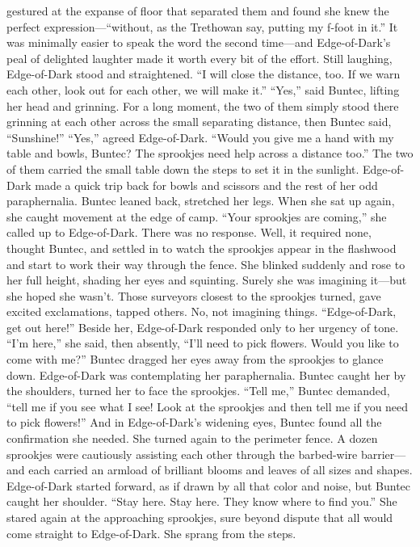 \documentclass[9pt]{article}
\begin{document}
gestured at the expanse of floor that separated them and found she knew the perfect
expression—“without, as the Trethowan say, putting my f-foot in it.” It was minimally easier to speak the
word the second time—and Edge-of-Dark’s peal of delighted laughter made it worth every bit of the
effort.
Still laughing, Edge-of-Dark stood and straightened. “I will close the distance, too. If we warn each
other, look out for each other, we will make it.”
“Yes,” said Buntec, lifting her head and grinning. For a long moment, the two of them simply stood
there grinning at each other across the small separating distance, then Buntec said, “Sunshine!”
“Yes,” agreed Edge-of-Dark. “Would you give me a hand with my table and bowls, Buntec? The
sprookjes need help across a distance too.”
The two of them carried the small table down the steps to set it in the sunlight. Edge-of-Dark made a
quick trip back for bowls and scissors and the rest of her odd paraphernalia.
Buntec leaned back, stretched her legs. When she sat up again, she caught movement at the edge of
camp. “Your sprookjes are coming,” she called up to Edge-of-Dark. There was no response. Well, it
required none, thought Buntec, and settled in to watch the sprookjes appear in the flashwood and start to
work their way through the fence.
She blinked suddenly and rose to her full height, shading her eyes and squinting. Surely she was
imagining it—but she hoped she wasn’t.
Those surveyors closest to the sprookjes turned, gave excited exclamations, tapped others. No, not
imagining things. “Edge-of-Dark, get out here!”
Beside her, Edge-of-Dark responded only to her urgency of tone. “I’m here,” she said, then
absently, “I’ll need to pick flowers. Would you like to come with me?”
Buntec dragged her eyes away from the sprookjes to glance down. Edge-of-Dark was
contemplating her paraphernalia. Buntec caught her by the shoulders, turned her to face the sprookjes.
“Tell me,” Buntec demanded, “tell me if you see what I see! Look at the sprookjes and then tell me if you
need to pick flowers!”
And in Edge-of-Dark’s widening eyes, Buntec found all the confirmation she needed. She turned
again to the perimeter fence.
A dozen sprookjes were cautiously assisting each other through the barbed-wire barrier—and each
carried an armload of brilliant blooms and leaves of all sizes and shapes.
Edge-of-Dark started forward, as if drawn by all that color and noise, but Buntec caught her
shoulder. “Stay here. Stay here. They know where to find you.” She stared again at the approaching
sprookjes, sure beyond dispute that all would come straight to Edge-of-Dark. She sprang from the steps.
\end{document}
